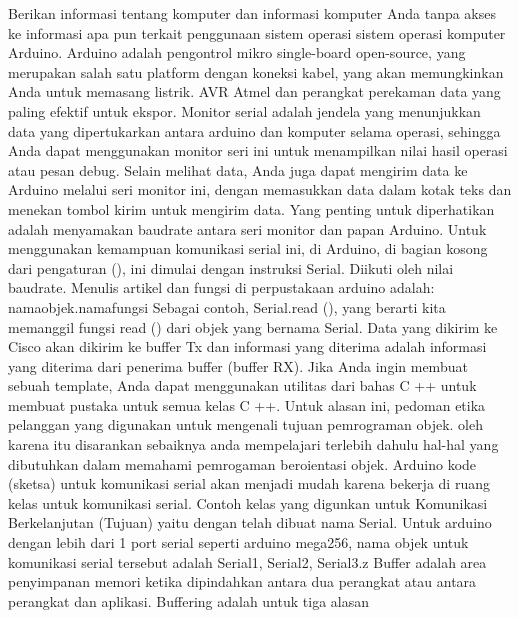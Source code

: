 Berikan informasi tentang komputer dan informasi komputer Anda tanpa akses ke informasi apa pun terkait penggunaan sistem operasi sistem operasi komputer Arduino. Arduino adalah pengontrol mikro single-board open-source, yang merupakan salah satu platform dengan koneksi kabel, yang akan memungkinkan Anda untuk memasang listrik. AVR Atmel dan perangkat perekaman data yang paling efektif untuk ekspor.
Monitor serial adalah jendela yang menunjukkan data yang dipertukarkan antara arduino dan komputer selama operasi, sehingga Anda dapat menggunakan monitor seri ini untuk menampilkan nilai hasil operasi atau pesan debug. Selain melihat data, Anda juga dapat mengirim data ke Arduino melalui seri monitor ini, dengan memasukkan data dalam kotak teks dan menekan tombol kirim untuk mengirim data. Yang penting untuk diperhatikan adalah menyamakan baudrate antara seri monitor dan papan Arduino.\cite{monk201330}
Untuk menggunakan kemampuan komunikasi serial ini, di Arduino, di bagian kosong dari pengaturan (), ini dimulai dengan instruksi Serial. Diikuti oleh nilai baudrate.
Menulis artikel dan fungsi di perpustakaan arduino adalah: namaobjek.namafungsi
Sebagai contoh, Serial.read (), yang berarti kita memanggil fungsi read () dari objek yang bernama Serial.
Data yang dikirim ke Cisco akan dikirim ke buffer Tx dan informasi yang diterima adalah informasi yang diterima dari penerima buffer (buffer RX).
Jika Anda ingin membuat sebuah template, Anda dapat menggunakan utilitas dari bahas C ++ untuk membuat pustaka untuk semua kelas C ++. Untuk alasan ini, pedoman etika pelanggan yang digunakan untuk mengenali tujuan pemrograman objek. oleh karena itu disarankan sebaiknya anda mempelajari terlebih dahulu hal-hal yang dibutuhkan dalam memahami pemrogaman beroientasi objek.
Arduino kode (sketsa) untuk komunikasi serial akan menjadi mudah karena bekerja di ruang kelas untuk komunikasi serial. Contoh kelas yang digunkan untuk Komunikasi Berkelanjutan (Tujuan) yaitu dengan telah dibuat nama Serial. Untuk arduino dengan lebih dari 1 port serial seperti arduino mega256, nama objek untuk komunikasi serial tersebut adalah Serial1, Serial2, Serial3.z
Buffer adalah area penyimpanan memori ketika dipindahkan antara dua perangkat atau antara perangkat dan aplikasi. Buffering adalah untuk tiga alasan
